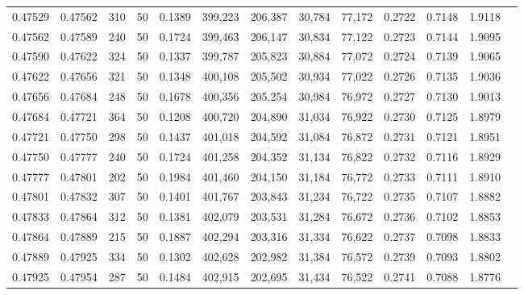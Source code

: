 \begin{tabular}{rrrrrrrrrrrrr}
0.47529 & 0.47562 &   310 &  50 &                                     0.1389 & 399,223 & 206,387 &  30,784 &  77,172 & 0.2722 & 0.7148 & 1.9118 \\
0.47562 & 0.47589 &   240 &  50 &                                     0.1724 & 399,463 & 206,147 &  30,834 &  77,122 & 0.2723 & 0.7144 & 1.9095 \\
0.47590 & 0.47622 &   324 &  50 &                                     0.1337 & 399,787 & 205,823 &  30,884 &  77,072 & 0.2724 & 0.7139 & 1.9065 \\
0.47622 & 0.47656 &   321 &  50 &                                     0.1348 & 400,108 & 205,502 &  30,934 &  77,022 & 0.2726 & 0.7135 & 1.9036 \\
0.47656 & 0.47684 &   248 &  50 &                                     0.1678 & 400,356 & 205,254 &  30,984 &  76,972 & 0.2727 & 0.7130 & 1.9013 \\
0.47684 & 0.47721 &   364 &  50 &                                     0.1208 & 400,720 & 204,890 &  31,034 &  76,922 & 0.2730 & 0.7125 & 1.8979 \\
0.47721 & 0.47750 &   298 &  50 &                                     0.1437 & 401,018 & 204,592 &  31,084 &  76,872 & 0.2731 & 0.7121 & 1.8951 \\
0.47750 & 0.47777 &   240 &  50 &                                     0.1724 & 401,258 & 204,352 &  31,134 &  76,822 & 0.2732 & 0.7116 & 1.8929 \\
0.47777 & 0.47801 &   202 &  50 &                                     0.1984 & 401,460 & 204,150 &  31,184 &  76,772 & 0.2733 & 0.7111 & 1.8910 \\
0.47801 & 0.47832 &   307 &  50 &                                     0.1401 & 401,767 & 203,843 &  31,234 &  76,722 & 0.2735 & 0.7107 & 1.8882 \\
0.47833 & 0.47864 &   312 &  50 &                                     0.1381 & 402,079 & 203,531 &  31,284 &  76,672 & 0.2736 & 0.7102 & 1.8853 \\
0.47864 & 0.47889 &   215 &  50 &                                     0.1887 & 402,294 & 203,316 &  31,334 &  76,622 & 0.2737 & 0.7098 & 1.8833 \\
0.47889 & 0.47925 &   334 &  50 &                                     0.1302 & 402,628 & 202,982 &  31,384 &  76,572 & 0.2739 & 0.7093 & 1.8802 \\
0.47925 & 0.47954 &   287 &  50 &                                     0.1484 & 402,915 & 202,695 &  31,434 &  76,522 & 0.2741 & 0.7088 & 1.8776 \\

\end{tabular}
